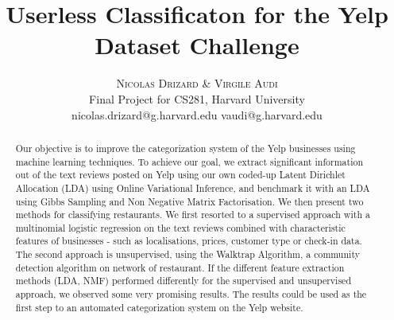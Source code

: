 \documentclass[twoside]{article}
\title{\vspace{-15mm}\fontsize{24pt}{10pt}\selectfont\textbf{Userless Classificaton for the Yelp Dataset Challenge}} %
\author{
\large
\textsc{Nicolas Drizard \& Virgile Audi}\\[2mm] %
\normalsize Final Project for CS281, Harvard University \\ %
\normalsize {nicolas.drizard@g.harvard.edu \quad vaudi@g.harvard.edu} %
\vspace{-5mm}
}
\date{}
\begin{document}
\maketitle %

\thispagestyle{fancy} %


\begin{abstract}

\noindent

Our objective is to improve the categorization system of the Yelp businesses using machine learning techniques. To achieve our goal, we extract significant information out of the text reviews posted on Yelp using our own coded-up Latent Dirichlet Allocation (LDA) using Online Variational Inference, and benchmark it with an LDA using Gibbs Sampling and Non Negative Matrix Factorisation. We then present two methods for classifying restaurants. We first resorted to a supervised approach with a multinomial logistic regression on  the text reviews combined with characteristic features of businesses - such as localisations, prices, customer type or check-in data. The second approach is unsupervised, using the Walktrap Algorithm, a community detection algorithm on network of restaurant. If the different feature extraction methods (LDA, NMF) performed differently for the supervised and unsupervised approach, we observed some very promising results. The results could be used as the first step to an automated categorization system on the Yelp website. 

\end{abstract}

\end{document}
